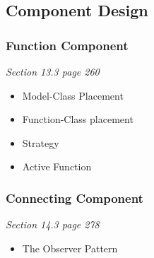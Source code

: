 \subsection{Component Design}
\subsubsection{Function Component}
\textit{Section 13.3 page 260}
\begin{itemize}
    \item Model-Class Placement
    \item Function-Class placement
    \item Strategy
    \item Active Function
\end{itemize}

\subsubsection{Connecting Component}
\textit{Section 14.3 page 278}
\begin{itemize}
    \item The Observer Pattern
\end{itemize}
